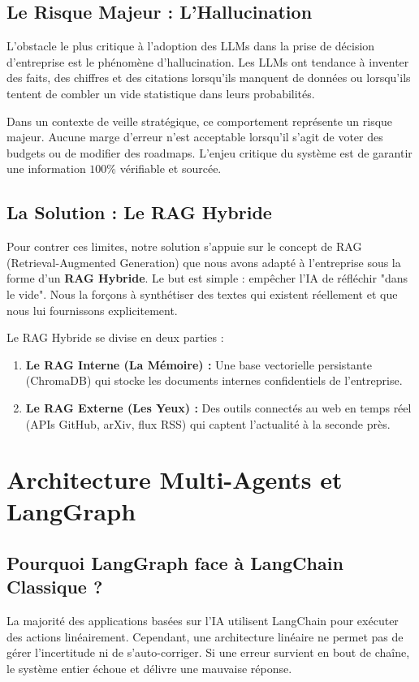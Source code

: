 \documentclass[12pt,a4paper]{report}
\begin{document}
\section{Le Risque Majeur : L'Hallucination}
L'obstacle le plus critique à l'adoption des LLMs dans la prise de décision d'entreprise est le phénomène d'hallucination. Les LLMs ont tendance à inventer des faits, des chiffres et des citations lorsqu'ils manquent de données ou lorsqu'ils tentent de combler un vide statistique dans leurs probabilités. 

Dans un contexte de veille stratégique, ce comportement représente un risque majeur. Aucune marge d'erreur n'est acceptable lorsqu'il s'agit de voter des budgets ou de modifier des roadmaps. L'enjeu critique du système est de garantir une information $100\%$ vérifiable et sourcée.

\section{La Solution : Le RAG Hybride}
Pour contrer ces limites, notre solution s'appuie sur le concept de RAG (Retrieval-Augmented Generation) que nous avons adapté à l'entreprise sous la forme d'un \textbf{RAG Hybride}. Le but est simple : empêcher l'IA de réfléchir "dans le vide". Nous la forçons à synthétiser des textes qui existent réellement et que nous lui fournissons explicitement.

Le RAG Hybride se divise en deux parties :
\begin{enumerate}
    \item \textbf{Le RAG Interne (La Mémoire) :} Une base vectorielle persistante (ChromaDB) qui stocke les documents internes confidentiels de l'entreprise.
    \item \textbf{Le RAG Externe (Les Yeux) :} Des outils connectés au web en temps réel (APIs GitHub, arXiv, flux RSS) qui captent l'actualité à la seconde près.
\end{enumerate}

\chapter{Architecture Multi-Agents et LangGraph}

\section{Pourquoi LangGraph face à LangChain Classique ?}
La majorité des applications basées sur l'IA utilisent LangChain pour exécuter des actions linéairement. Cependant, une architecture linéaire ne permet pas de gérer l'incertitude ni de s'auto-corriger. Si une erreur survient en bout de chaîne, le système entier échoue et délivre une mauvaise réponse.
\end{document}
